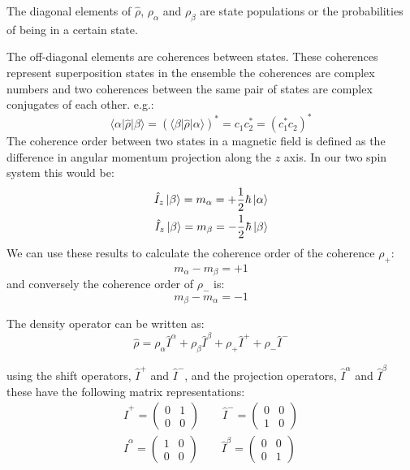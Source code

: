 The diagonal elements of $\hat{\rho}$, $\rho_\alpha$ and $\rho_\beta$ are state populations or the probabilities of being in a certain state.

The off-diagonal elements are coherences between states. These coherences represent superposition states in the ensemble
the coherences are complex numbers and two coherences between the same pair of states are complex conjugates of each other. e.g.:
\begin{equation}
  \langle\alpha\vert\hat\rho\vert\beta\rangle = (\langle\beta\vert\hat\rho\vert\alpha\rangle)^* = c_1c_2^* = (c_1^*c_2)^*
\end{equation}
The coherence order between two states in a magnetic field is defined as the difference in angular
momentum projection along the $z$ axis. In our two spin system this would be:
\begin{align}
  \hat{I}_z\ket{\beta} = m_\alpha = +\frac{1}{2}\hbar\ket{\alpha}\\
  \hat{I}_z\ket{\beta} = m_\beta = -\frac{1}{2}\hbar\ket{\beta}
\end{align}
We can use these results to calculate the coherence order of the coherence $\rho_+$:
\begin{equation}
 m_\alpha - m_\beta = +1
\end{equation}
and conversely the coherence order of $\rho_-$ is:
\begin{equation}
  m_\beta - m_\alpha = -1
\end{equation}

The density operator can be written as:
\begin{equation}
  \hat{\rho} = \rho_\alpha\hat{I}^\alpha + \rho_\beta\hat{I}^\beta + \rho_+\hat{I}^+ + \rho_-\hat{I}^-
\end{equation}

using the shift operators, $\hat{I}^+$ and $\hat{I}^-$, and the projection operators, $\hat{I}^\alpha$ and $\hat{I}^\beta$ these have the following matrix representations:
\begin{align}
  \hat{I}^+ = \begin{pmatrix}
    0 & 1\\
    0 & 0
\end{pmatrix}\qquad\hat{I}^- = \begin{pmatrix}
  0 & 0\\
  1 & 0
\end{pmatrix}\\
\hat{I}^\alpha = \begin{pmatrix}
  1 & 0\\
  0 & 0
\end{pmatrix}\qquad\hat{I}^\beta = \begin{pmatrix}
  0 & 0\\
  0 & 1
\end{pmatrix}
\end{align}

